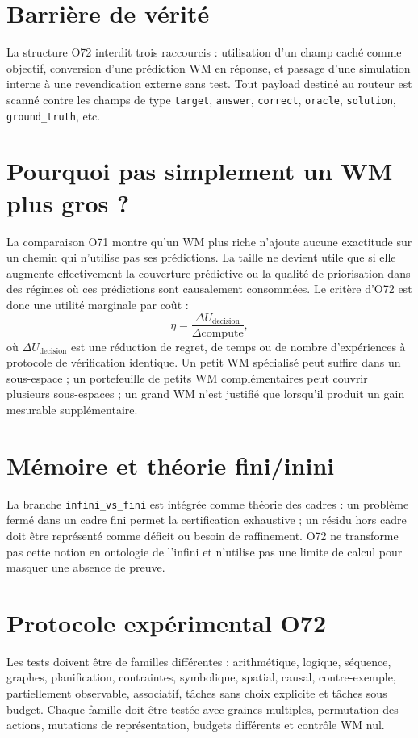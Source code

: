 \documentclass[11pt,a4paper]{article}
\begin{document}
\section{Barrière de vérité}
La structure O72 interdit trois raccourcis : utilisation d'un champ caché comme objectif, conversion d'une prédiction WM en réponse, et passage d'une simulation interne à une revendication externe sans test. Tout payload destiné au routeur est scanné contre les champs de type \texttt{target}, \texttt{answer}, \texttt{correct}, \texttt{oracle}, \texttt{solution}, \texttt{ground\_truth}, etc.
\section{Pourquoi pas simplement un WM plus gros ?}
La comparaison O71 montre qu'un WM plus riche n'ajoute aucune exactitude sur un chemin qui n'utilise pas ses prédictions. La taille ne devient utile que si elle augmente effectivement la couverture prédictive ou la qualité de priorisation dans des régimes où ces prédictions sont causalement consommées. Le critère d'O72 est donc une utilité marginale par coût :
\[
\eta=\frac{\Delta U_{\mathrm{decision}}}{\Delta\mathrm{compute}},
\]
où $\Delta U_{\mathrm{decision}}$ est une réduction de regret, de temps ou de nombre d'expériences à protocole de vérification identique. Un petit WM spécialisé peut suffire dans un sous-espace ; un portefeuille de petits WM complémentaires peut couvrir plusieurs sous-espaces ; un grand WM n'est justifié que lorsqu'il produit un gain mesurable supplémentaire.
\section{Mémoire et théorie fini/inini}
La branche \texttt{infini\_vs\_fini} est intégrée comme théorie des cadres : un problème fermé dans un cadre fini permet la certification exhaustive ; un résidu hors cadre doit être représenté comme déficit ou besoin de raffinement. O72 ne transforme pas cette notion en ontologie de l'infini et n'utilise pas une limite de calcul pour masquer une absence de preuve.
\section{Protocole expérimental O72}
Les tests doivent être de familles différentes : arithmétique, logique, séquence, graphes, planification, contraintes, symbolique, spatial, causal, contre-exemple, partiellement observable, associatif, tâches sans choix explicite et tâches sous budget. Chaque famille doit être testée avec graines multiples, permutation des actions, mutations de représentation, budgets différents et contrôle WM nul.
\end{document}
